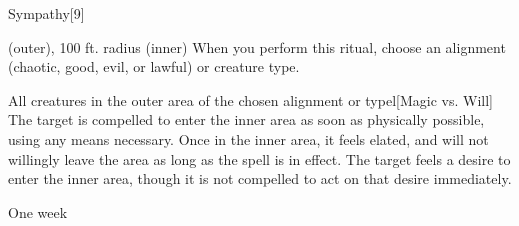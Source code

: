\begin{spellsection}{Sympathy}[9]
    \begin{spellheader}
    \end{spellheader}
    \begin{spellcontent}
        \begin{spelltargetinginfo}
            \spellrng{\rngclose}
        \end{spelltargetinginfo}
        \begin{spelleffects}

             (outer), 100 ft. radius (inner)
            \spellspecial When you perform this ritual, choose an alignment (chaotic, good, evil, or lawful) or creature type.
            \begin{spelltargets}{All creatures in the outer area of the chosen alignment or type}l[Magic vs. Will]
                \spellsuccess The target is compelled to enter the inner area as soon as physically possible, using any means necessary. Once in the inner area, it feels elated, and will not willingly leave the area as long as the spell is in effect.
                \spellfailure The target feels a desire to enter the inner area, though it is not compelled to act on that desire immediately.
            \end{spelltargets}
            \spelldur One week \dismissable
        \end{spelleffects}
    \end{spellcontent}
    \begin{spellfooter}
    \end{spellfooter}
\end{spellsection}

